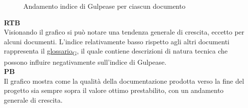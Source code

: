 \begin{figure*}[!h]
    \caption{Andamento indice di Gulpease per ciascun documento}
\end{figure*}
\begin{flushleft}
\textbf{RTB} \\
Visionando il grafico si può notare una tendenza generale di crescita, eccetto per alcuni documenti. L'indice relativamente basso rispetto agli altri documenti rappresenta il \href{https://7last.github.io/docs/pb/documentazione-interna/glossario\#glossario}{glossario\textsubscript{G}}, il quale contiene descrizioni di natura tecnica che possono influire negativamente sull'indice di Gulpease. \\
\textbf{PB} \\
Il grafico mostra come la qualità della documentazione prodotta verso la fine del progetto sia sempre sopra il valore ottimo prestabilito, con un andamento generale di crescita. 
\end{flushleft}

\newpage

